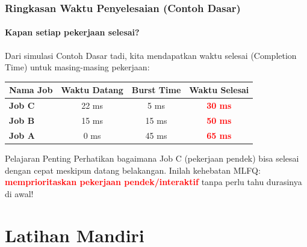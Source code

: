 \documentclass[t,aspectratio=169,xcolor=dvipsnames]{beamer}
\newcommand{\tem}[1]{\textbf{\textcolor{red}{#1}}}
\begin{document}
\begin{frame}
    \frametitle{Ringkasan Waktu Penyelesaian (Contoh Dasar)}
    \framesubtitle{Kapan setiap pekerjaan selesai?}
    \small
    Dari simulasi Contoh Dasar tadi, kita mendapatkan waktu selesai (Completion Time) untuk masing-masing pekerjaan:
    \vspace{0.3cm}
    \begin{table}[]
        \centering
        \begin{tabular}{lccc}
            \toprule
            \textbf{Nama Job} & \textbf{Waktu Datang} & \textbf{Burst Time} & \textbf{Waktu Selesai} \\
            \midrule
            \textbf{Job C} & 22 ms & 5 ms & \tem{30 ms} \\
            \textbf{Job B} & 15 ms & 15 ms & \tem{50 ms} \\
            \textbf{Job A} & 0 ms & 45 ms & \tem{65 ms} \\
            \bottomrule
        \end{tabular}
    \end{table}
    \vspace{0.3cm}
    \begin{alertblock}{Pelajaran Penting}
        Perhatikan bagaimana Job C (pekerjaan pendek) bisa selesai dengan cepat meskipun datang belakangan. Inilah kehebatan MLFQ: \tem{memprioritaskan pekerjaan pendek/interaktif} tanpa perlu tahu durasinya di awal!
    \end{alertblock}
\end{frame}

\section{Latihan Mandiri}
\end{document}
